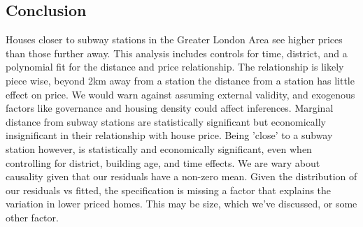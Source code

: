 \subsection{Conclusion}
Houses closer to subway stations in the Greater London Area see higher prices than those further away. 
This analysis includes controls for time, district, and a polynomial fit for the distance and price relationship.
The relationship is likely piece wise, beyond 2km away from a station the distance from a station has little effect on price.
We would warn against assuming external validity, and exogenous factors like governance and housing density could affect inferences. 
Marginal distance from subway stations are statistically significant but economically insignificant in their relationship with house price.
Being 'close' to a subway station however, is statistically and economically significant, even when controlling for district, building age,
 and time effects. We are wary about causality given that our residuals have a non-zero mean. Given the 
 distribution of our residuals vs fitted, the specification is missing a factor that explains the variation in lower priced homes. This may be size, which we've discussed,
 or some other factor.